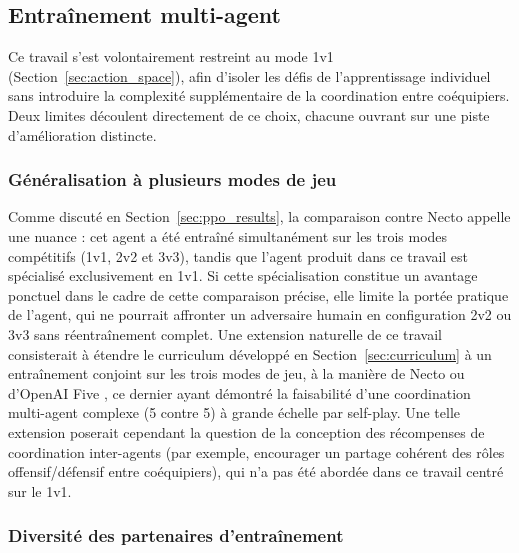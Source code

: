 \subsection{Entraînement multi-agent}

Ce travail s'est volontairement restreint au mode 1v1 (Section~\ref{sec:action_space}), afin d'isoler les défis de l'apprentissage individuel sans introduire la complexité supplémentaire de la coordination entre coéquipiers. Deux limites découlent directement de ce choix, chacune ouvrant sur une piste d'amélioration distincte.

\subsubsection{Généralisation à plusieurs modes de jeu}

Comme discuté en Section~\ref{sec:ppo_results}, la comparaison contre Necto 
\parencite{rolv-arildRolvArildNecto2026} appelle une nuance : cet agent a été entraîné simultanément sur les trois modes compétitifs (1v1, 2v2 et 3v3), tandis que l'agent produit dans ce travail est spécialisé exclusivement en 1v1. Si cette spécialisation constitue un avantage ponctuel dans le cadre de cette comparaison précise, elle limite la portée pratique de l'agent, qui ne pourrait affronter un adversaire humain en configuration 2v2 ou 3v3 sans réentraînement 
complet. Une extension naturelle de ce travail consisterait à étendre le curriculum développé en Section~\ref{sec:curriculum} à un entraînement conjoint sur les trois modes de jeu, à la manière de Necto \parencite{rolv-arildRolvArildNecto2026} ou d'OpenAI Five \parencite{openaiDota2Large2019}, ce dernier ayant démontré la faisabilité d'une coordination multi-agent complexe (5 contre 5) à grande échelle par self-play. 
Une telle extension poserait cependant la question de la conception des récompenses de coordination inter-agents (par exemple, encourager un partage cohérent des rôles offensif/défensif entre coéquipiers), qui n'a pas été abordée dans ce travail centré sur le 1v1.

\subsubsection{Diversité des partenaires d'entraînement}

